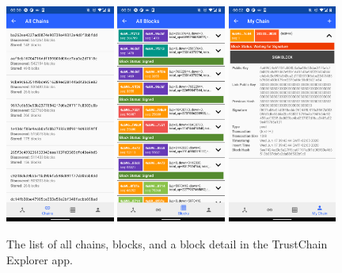 \begin{figure}
    \centering
    \includegraphics[width=0.32\textwidth]{screens/superapp/explorer_chains}
    \includegraphics[width=0.32\textwidth]{screens/superapp/explorer_blocks}
    \includegraphics[width=0.32\textwidth]{screens/superapp/explorer_mychain}
    \caption{The list of all chains, blocks, and a block detail in the TrustChain Explorer app.}
    \label{trustchainexplorer}
\end{figure}



